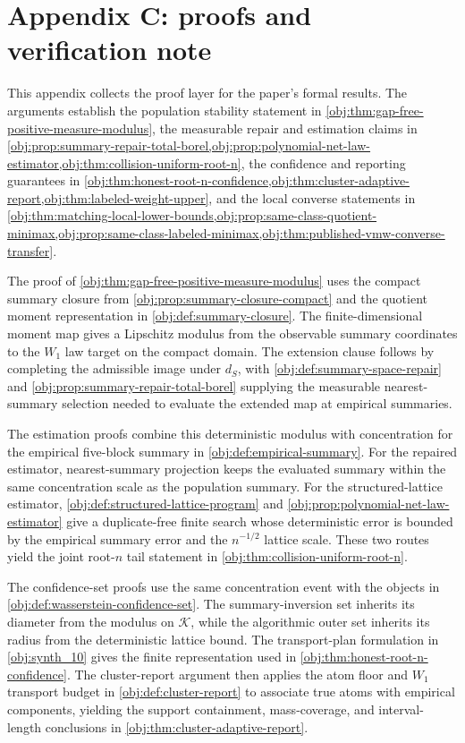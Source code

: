 \section{Appendix C: proofs and verification note}

This appendix collects the proof layer for the paper's formal results. The arguments establish the population stability statement in \cref{obj:thm:gap-free-positive-measure-modulus}, the measurable repair and estimation claims in \cref{obj:prop:summary-repair-total-borel,obj:prop:polynomial-net-law-estimator,obj:thm:collision-uniform-root-n}, the confidence and reporting guarantees in \cref{obj:thm:honest-root-n-confidence,obj:thm:cluster-adaptive-report,obj:thm:labeled-weight-upper}, and the local converse statements in \cref{obj:thm:matching-local-lower-bounds,obj:prop:same-class-quotient-minimax,obj:prop:same-class-labeled-minimax,obj:thm:published-vmw-converse-transfer}.

The proof of \cref{obj:thm:gap-free-positive-measure-modulus} uses the compact summary closure from \cref{obj:prop:summary-closure-compact} and the quotient moment representation in \cref{obj:def:summary-closure}. The finite-dimensional moment map gives a Lipschitz modulus from the observable summary coordinates to the \(W_1\) law target on the compact domain. The extension clause follows by completing the admissible image under \(d_S\), with \cref{obj:def:summary-space-repair} and \cref{obj:prop:summary-repair-total-borel} supplying the measurable nearest-summary selection needed to evaluate the extended map at empirical summaries.

The estimation proofs combine this deterministic modulus with concentration for the empirical five-block summary in \cref{obj:def:empirical-summary}. For the repaired estimator, nearest-summary projection keeps the evaluated summary within the same concentration scale as the population summary. For the structured-lattice estimator, \cref{obj:def:structured-lattice-program} and \cref{obj:prop:polynomial-net-law-estimator} give a duplicate-free finite search whose deterministic error is bounded by the empirical summary error and the \(n^{-1/2}\) lattice scale. These two routes yield the joint root-\(n\) tail statement in \cref{obj:thm:collision-uniform-root-n}.

The confidence-set proofs use the same concentration event with the objects in \cref{obj:def:wasserstein-confidence-set}. The summary-inversion set inherits its diameter from the modulus on \(\mathcal K\), while the algorithmic outer set inherits its radius from the deterministic lattice bound. The transport-plan formulation in \cref{obj:synth_10} gives the finite representation used in \cref{obj:thm:honest-root-n-confidence}. The cluster-report argument then applies the atom floor and \(W_1\) transport budget in \cref{obj:def:cluster-report} to associate true atoms with empirical components, yielding the support containment, mass-coverage, and interval-length conclusions in \cref{obj:thm:cluster-adaptive-report}.

